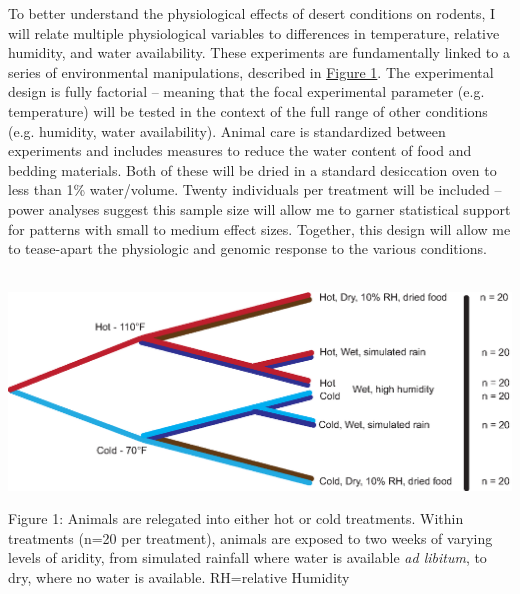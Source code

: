 \documentclass[11pt]{article}
\begin{document}
To better understand the physiological effects of desert conditions on rodents, I will relate multiple physiological variables to differences in temperature, relative humidity, and water availability. These experiments are fundamentally linked to a series of environmental manipulations, described in \hyperlink{Figure 1}{Figure 1}. The experimental design is fully factorial -- meaning that the focal experimental parameter (e.g. temperature) will be tested in the context of the full range of other conditions (e.g. humidity, water availability). Animal care is standardized between experiments and includes measures to reduce the water content of food and bedding materials. Both of these will be dried in a standard desiccation oven to less than 1\% water/volume. Twenty individuals per treatment will be included -- power analyses suggest this sample size will allow me to garner statistical support for patterns with small to medium effect sizes. Together, this design will allow me to tease-apart the physiologic and genomic response to the various conditions.  \\

\vspace{2mm}
\\

\begin{mdframed}
  \begin{center}
    \includegraphics[width=1\textwidth]{exp_design_fig.eps}
  \end{center}  

\noindent \small{Figure 1: Animals are relegated into either hot or cold treatments. Within treatments (n=20 per treatment), animals are exposed to two weeks of varying levels of aridity, from simulated rainfall where water is available \textit{ad libitum}, to dry, where no water is available. RH=relative Humidity}

\end{mdframed}

\vspace{5mm}
\end{document}
